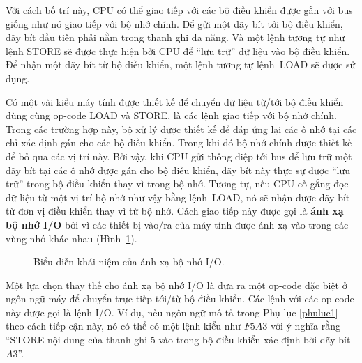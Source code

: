 Với cách bố trí này, CPU có thể giao tiếp với các bộ điều khiển được gắn với bus giống như
nó giao tiếp với bộ nhớ chính. Để gửi một dãy bít tới bộ điều khiển, dãy bít đầu tiên phải
nằm trong thanh ghi đa năng. Và một lệnh tương tự như lệnh STORE sẽ được thực hiện bởi CPU
để ``lưu trữ'' dữ liệu vào bộ điều khiển. Để nhận một dãy bít từ bộ điều khiển, một lệnh
tương tự lệnh~LOAD sẽ được sử dụng.

Có một vài kiểu máy tính được thiết kế để chuyển dữ liệu từ/tới bộ điều khiển dùng cùng
op-code LOAD và STORE, là các lệnh giao tiếp với bộ nhớ chính. Trong các trường hợp này,
bộ xử lý được thiết kế để đáp ứng lại các ô nhớ tại các chỉ xác định gán cho các bộ điều
khiển. Trong khi đó bộ nhớ chính được thiết kế để bỏ qua các vị trí này. Bởi vậy, khi CPU
gửi thông điệp tới bus để lưu trữ một dãy bít tại các ô nhớ được gán cho bộ điều khiển,
dãy bít này thực sự được ``lưu trữ'' trong bộ điều khiển thay vì trong bộ nhớ. Tương tự,
nếu CPU cố gắng đọc dữ liệu từ một vị trí bộ nhớ như vậy bằng lệnh~LOAD, nó sẽ nhận được
dãy bít từ đơn vị điều khiển thay vì từ bộ nhớ. Cách giao tiếp này được gọi là \textbf{ánh
  xạ bộ nhớ I/O} bởi vì các thiết bị vào/ra của máy tính được ánh xạ vào trong các vùng
nhớ khác nhau (Hình~\ref{fig:fig214}).

\begin{figure}
  \centering {}
  \caption{Biểu diễn khái niệm của ánh xạ bộ nhớ I/O.}
  \label{fig:fig214}
\end{figure}

Một lựa chọn thay thế cho ánh xạ bộ nhớ I/O là đưa ra một op-code đặc biệt ở ngôn ngữ máy
để chuyển trực tiếp tới/từ bộ điều khiển. Các lệnh với các op-code này được gọi là lệnh
I/O. Ví dụ, nếu ngôn ngữ mô tả trong Phụ lục \ref{phuluc1} theo cách tiếp cận này, nó có
thể có một lệnh kiểu như $F5A3$ với ý nghĩa rằng ``STORE nội dung của thanh ghi $5$ vào
trong bộ điều khiển xác định bởi dãy bít $A3$''.

